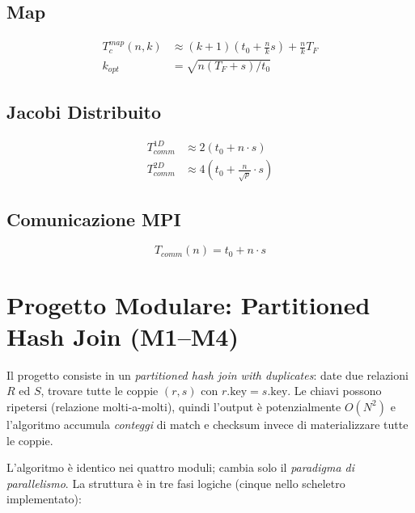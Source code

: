 \documentclass[11pt,a4paper]{article}
\theoremstyle{remark}
\begin{document}
\subsection{Map}
\begin{align*}
T_c^{map}(n,k) &\approx (k+1)(t_0 + \tfrac{n}{k} s) + \tfrac{n}{k} T_F \\
k_{opt} &= \sqrt{n(T_F + s) / t_0}
\end{align*}

\subsection{Jacobi Distribuito}
\begin{align*}
T_{comm}^{1D} &\approx 2(t_0 + n \cdot s) \\
T_{comm}^{2D} &\approx 4\!\left(t_0 + \tfrac{n}{\sqrt{p}} \cdot s\right)
\end{align*}

\subsection{Comunicazione MPI}
\begin{equation}
T_{comm}(n) = t_0 + n \cdot s
\end{equation}



\clearpage


\section{Progetto Modulare: Partitioned Hash Join (M1--M4)}
\label{sec:progetto-moduli}

Il progetto consiste in un \emph{partitioned hash join with duplicates}: date due relazioni $R$ ed $S$, trovare tutte le coppie $(r,s)$ con $r.\text{key}=s.\text{key}$. Le chiavi possono ripetersi (relazione molti-a-molti), quindi l'output \`e potenzialmente $O(N^2)$ e l'algoritmo accumula \emph{conteggi} di match e checksum invece di materializzare tutte le coppie.

L'algoritmo \`e identico nei quattro moduli; cambia solo il \emph{paradigma di parallelismo}. La struttura \`e in tre fasi logiche (cinque nello scheletro implementato):
\end{document}
